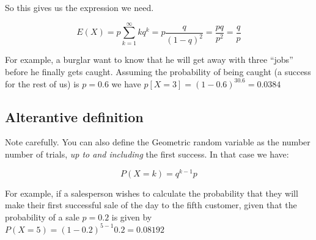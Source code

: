 \documentclass[12pt]{extbook}
\newtheorem{df}{Definition}[section]
\begin{document}
So this gives us the expression we need.

\begin{displaymath}
 E(X) = p \sum_{k=1}^{\infty} k q^k = p \frac{q}{(1-q)^2} = \frac{pq}{p^2} = \frac{q}{p}
\end{displaymath}


For example, a burglar want to know that he will get away with three ``jobs'' before he finally gets caught.  Assuming the probability of being caught (a success for the rest of us) is $p=0.6$ we have $p[X=3]=(1-0.6)^30.6=0.0384$


\subsection{Alterantive definition}
  

Note carefully.   You can also define the Geometric random variable as the number number of trials, \emph{up to and including} the first success.   In that case we have:

\begin{displaymath}
P(X=k) = q^{k-1}p
\end{displaymath}


For example, if a salesperson wishes to calculate the probability that they will make their first successful sale of the day to the fifth customer, given that the probability of a sale $p=0.2$ is given by $P(X=5)=(1-0.2)^{5-1}0.2 = 0.08192$












\end{document}
